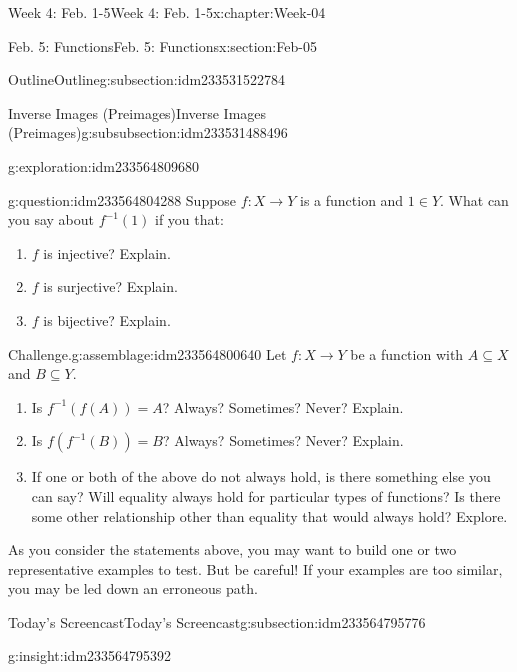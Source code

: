 \documentclass[oneside,10pt,]{book}
\numberwithin{equation}{section}
\newlength{\qrsize}
\newlength{\previewwidth}
\begin{document}
\begin{chapterptx}{Week 4: Feb. 1-5}{}{Week 4: Feb. 1-5}{}{}{x:chapter:Week-04}
\begin{sectionptx}{Feb. 5: Functions}{}{Feb. 5: Functions}{}{}{x:section:Feb-05}
\begin{subsectionptx}{Outline}{}{Outline}{}{}{g:subsection:idm233531522784}
\begin{subsubsectionptx}{Inverse Images (Preimages)}{}{Inverse Images (Preimages)}{}{}{g:subsubsection:idm233531488496}
\begin{exploration}{}{g:exploration:idm233564809680}
\begin{enumerate}
\end{enumerate}
\end{exploration}%
\begin{question}{}{g:question:idm233564804288}%
Suppose \(f : X\to Y\) is a function and \(1\in Y\). What can you say about \(f^{-1}(1)\) if you that:%
%
\begin{enumerate}
\item{}\(f\) is injective? Explain.%
\item{}\(f\) is surjective? Explain.%
\item{}\(f\) is bijective? Explain.%
\end{enumerate}
\end{question}
\begin{assemblage}{Challenge.}{g:assemblage:idm233564800640}%
Let \(f: X\to Y\) be a function with \(A\subseteq X\) and \(B\subseteq Y\). %
\begin{enumerate}
\item{}Is \(f^{-1}(f(A))=A\)? Always? Sometimes? Never? Explain.%
\item{}Is \(f(f^{-1}(B)) = B\)? Always? Sometimes? Never? Explain.%
\item{}If one or both of the above do not always hold, is there something else you can say? Will equality always hold for particular types of functions? Is there some other relationship other than equality that would always hold? Explore.%
\end{enumerate}
 As you consider the statements above, you may want to build one or two representative examples to test. But be careful! If your examples are too similar, you may be led down an erroneous path.%
\end{assemblage}
\end{subsubsectionptx}
\end{subsectionptx}
%
%
\typeout{************************************************}
\typeout{************************************************}
%
\begin{subsectionptx}{Today's Screencast}{}{Today's Screencast}{}{}{g:subsection:idm233564795776}
\begin{insight}{}{g:insight:idm233564795392}%
\setlength{\qrsize}{9em}
\setlength{\previewwidth}{\linewidth}
\addtolength{\previewwidth}{-\qrsize}
\begin{tcbraster}[raster columns=2, raster column skip=1pt, raster halign=center, raster force size=false, raster left skip=0pt, raster right skip=0pt]%
\begin{tcolorbox}[previewstyle, width=\previewwidth]%

\end{tcolorbox}
\end{tcbraster}
\end{insight}
\end{subsectionptx}
\end{sectionptx}
\end{chapterptx}
\end{document}
